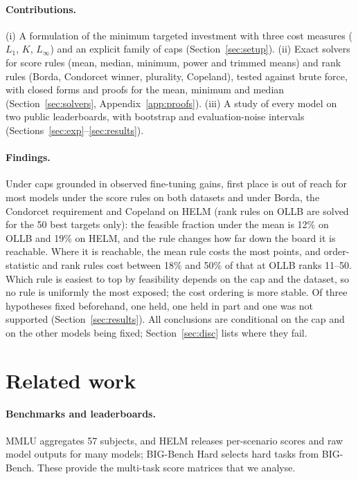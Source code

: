 \documentclass{article}
\begin{document}
\paragraph{Contributions.}
(i) A formulation of the minimum targeted investment with three cost measures ($L_1$, $K$, $L_\infty$) and an explicit family of caps (Section~\ref{sec:setup}). (ii) Exact solvers for score rules (mean, median, minimum, power and trimmed means) and rank rules (Borda, Condorcet winner, plurality, Copeland), tested against brute force, with closed forms and proofs for the mean, minimum and median (Section~\ref{sec:solvers}, Appendix~\ref{app:proofs}). (iii) A study of every model on two public leaderboards, with bootstrap and evaluation-noise intervals (Sections~\ref{sec:exp}--\ref{sec:results}).

\paragraph{Findings.}
Under caps grounded in observed fine-tuning gains, first place is out of reach for most models under the score rules on both datasets and under Borda, the Condorcet requirement and Copeland on HELM (rank rules on OLLB are solved for the 50 best targets only): the feasible fraction under the mean is 12\% on OLLB and 19\% on HELM, and the rule changes how far down the board it is reachable. Where it is reachable, the mean rule costs the most points, and order-statistic and rank rules cost between 18\% and 50\% of that at OLLB ranks 11--50. Which rule is easiest to top by feasibility depends on the cap and the dataset, so no rule is uniformly the most exposed; the cost ordering is more stable. Of three hypotheses fixed beforehand, one held, one held in part and one was not supported (Section~\ref{sec:results}). All conclusions are conditional on the cap and on the other models being fixed; Section~\ref{sec:disc} lists where they fail.

\section{Related work}
\label{sec:related}
\paragraph{Benchmarks and leaderboards.}
MMLU \citep{hendrycks2021mmlu} aggregates 57 subjects, and HELM \citep{liang2023helm} releases per-scenario scores and raw model outputs for many models; BIG-Bench Hard \citep{suzgun2023bbh} selects hard tasks from BIG-Bench. These provide the multi-task score matrices that we analyse.
\end{document}
